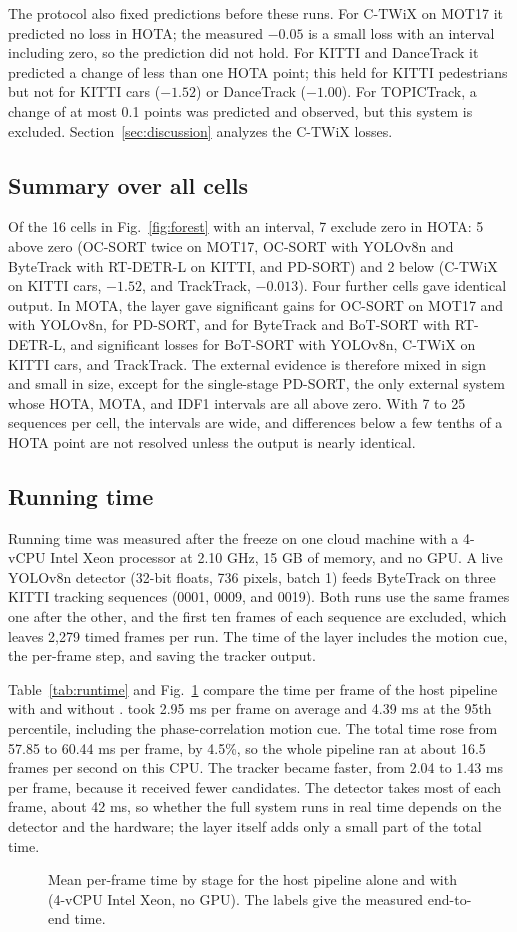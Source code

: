 The protocol also fixed predictions before these runs. For C-TWiX on MOT17 it
predicted no loss in HOTA; the measured $-0.05$ is a small loss with an
interval including zero, so the prediction did not hold. For KITTI and
DanceTrack it predicted a change of less than one HOTA point; this held for
KITTI pedestrians but not for KITTI cars ($-1.52$) or DanceTrack ($-1.00$).
For TOPICTrack, a change of at most 0.1 points was predicted and observed,
but this system is excluded. Section~\ref{sec:discussion} analyzes the
C-TWiX losses.



\subsection{Summary over all cells}\label{sec:summary}
Of the 16 cells in Fig.~\ref{fig:forest} with an interval, 7 exclude zero in
HOTA: 5 above zero (OC-SORT twice on MOT17, OC-SORT with YOLOv8n and
ByteTrack with RT-DETR-L on KITTI, and PD-SORT) and 2 below (C-TWiX on KITTI
cars, $-1.52$, and TrackTrack, $-0.013$). Four further cells gave identical
output. In MOTA, the layer gave significant gains for OC-SORT on MOT17 and
with YOLOv8n, for PD-SORT, and for ByteTrack and BoT-SORT with RT-DETR-L, and
significant losses for BoT-SORT with YOLOv8n, C-TWiX on KITTI cars, and
TrackTrack. The external evidence is therefore mixed in sign and small in
size, except for the single-stage PD-SORT, the only external system whose
HOTA, MOTA, and IDF1 intervals are all above zero. With 7 to 25 sequences
per cell, the intervals are wide, and differences below a few tenths of a
HOTA point are not resolved unless the output is nearly identical.

\subsection{Running time}\label{sec:latency}
\label{sec:latency-setup}Running time was measured after the freeze on one cloud machine with a 4-vCPU
Intel Xeon processor at 2.10 GHz, 15 GB of memory, and no GPU. A live YOLOv8n
detector (32-bit floats, 736 pixels, batch 1) feeds ByteTrack on three KITTI
tracking sequences (0001, 0009, and 0019). Both runs use the same frames
one after the other, and the first ten frames of each sequence are excluded,
which leaves 2,279 timed frames per run. The time of the layer includes the
motion cue, the per-frame step, and saving the tracker output.

Table~\ref{tab:runtime} and Fig.~\ref{fig:runtime} compare the time per frame
of the host pipeline with and without \scl{}. \scl{} took 2.95 ms per
frame on average and 4.39 ms at the 95th percentile, including the
phase-correlation motion cue. The total time rose from 57.85 to 60.44 ms
per frame, by 4.5\%, so the whole pipeline ran at about 16.5 frames per second
on this CPU. The tracker became faster, from 2.04 to 1.43 ms per frame,
because it received fewer candidates. The detector takes most of each frame,
about 42 ms, so whether the full system runs in real time depends on the
detector and the hardware; the layer itself adds only a small part of the
total time.



\begin{figure}[t]
\centering

\caption{Mean per-frame time by stage for the host pipeline alone and with
\scl{} (4-vCPU Intel Xeon, no GPU). The labels give the measured
end-to-end time.}
\label{fig:runtime}
\end{figure}

